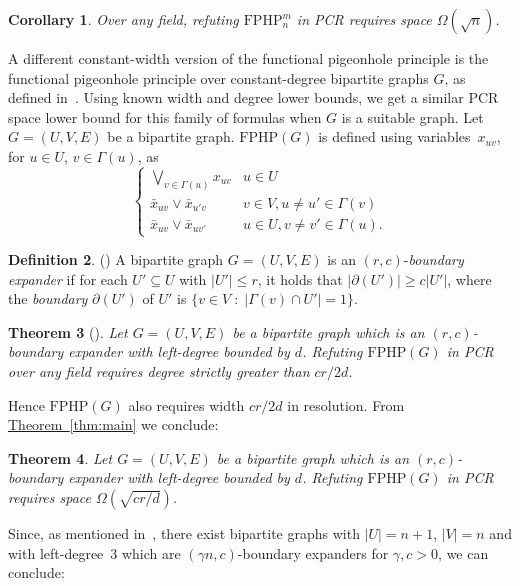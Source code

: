 \documentclass[11pt]{article}
\numberwithin{equation}{section}
\newtheorem{theorem}{Theorem}[section]
\newtheorem{corollary}[theorem]{Corollary}
\theoremstyle{definition}
\newtheorem{definition}[theorem]{Definition}
\theoremstyle{plain}
\newcommand{\expref}[2]{\hyperref[#2]{#1~\ref{#2}}}
\newcommand\FPHP{\mathrm{FPHP}}
\begin{document}
\begin{corollary} \label{cor:FPHP_space}
Over any field, refuting $\FPHP^m_n$ in PCR requires space $\Omega(\sqrt{n})$.
\end{corollary}

A different constant-width version of the functional pigeonhole principle is the functional pigeonhole principle over 
constant-degree bipartite graphs $G$, as defined in~\cite{DBLP:conf/coco/MiksaN15}. Using known width and degree lower bounds, we  get a similar PCR space lower bound for this family of formulas when $G$ is a suitable graph. 
Let $G=(U,V,E)$ be a bipartite graph. $\FPHP(G)$ is defined using variables~$x_{uv}$,  for $u\in U$, $v \in \Gamma(u)$,
as 
 $$
\left \{
\begin{array}{ll}
\bigvee_{v\in\Gamma(u)}x_{uv}  & u \in U   \\
\bar x_{uv} \vee \bar x_{u'v}  & v\in V,u \not = u' \in \Gamma(v) \\
\bar x_{uv} \vee \bar x_{uv'}&  u \in U,  v \not = v'\in \Gamma(u).
\end{array}
\right.
$$

%
%
\begin{definition} (\cite[Definition 3.1]{DBLP:conf/coco/MiksaN15}) 
%
A bipartite graph $G=(U,V,E)$ is an $(r,c)$-\emph{boundary expander} if for each 
$U'\subseteq U$ with $|U'|\leq r$, it holds that $|\partial(U')| \geq c |U'|$,
where the \emph{boundary} $\partial(U')$ of $U'$ is $\{v \in V \; : \; |\Gamma(v) \cap U'|=1\}$.
\end{definition}

%
%
%
%
\begin{theorem}[{\cite[Theorem 5.8]{DBLP:conf/coco/MiksaN15}}]
%
Let $G=(U,V,E)$  be a bipartite graph which is an $(r,c)$-boundary expander
with left-degree bounded by $d$. 
Refuting $\FPHP(G)$ in PCR over any field requires degree strictly
greater than $cr /2d$.
\end{theorem}

Hence $\FPHP(G)$ also requires width  $cr/2d$ in resolution. From \expref{Theorem}{thm:main}  
we conclude:

\begin{theorem}
Let $G=(U,V,E)$ be a bipartite graph which is an $(r,c)$-boundary expander
with left-degree bounded by $d$.   
Refuting $\FPHP(G)$ in PCR requires space $\Omega(\sqrt{{c r}/{d}})$.
\end{theorem}

Since, as mentioned in~\cite{DBLP:conf/coco/MiksaN15}, 
there exist bipartite graphs with $|U| = n+1$, $|V| = n$ and with left-degree~3 
which are $(\gamma n, c)$-boundary expanders for $\gamma, c > 0$, we can conclude:
\end{document}
